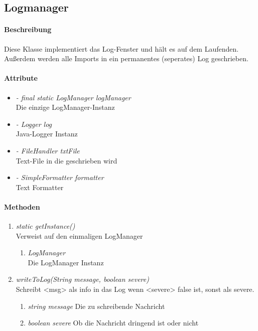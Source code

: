 \subsection{Logmanager}

\paragraph{Beschreibung}
Diese Klasse implementiert das Log-Fenster und hält es auf dem Laufenden.
Außerdem werden alle Imports in ein permanentes (seperates) Log geschrieben.


\paragraph{Attribute}

\begin{itemize}
	
\item \textit{- final static LogManager logManager}  
\\ Die einzige LogManager-Instanz 
\item \textit{- Logger log}
\\ Java-Logger Instanz
\item \textit{- FileHandler txtFile}
\\ Text-File in die geschrieben wird
\item \textit{-  SimpleFormatter formatter}
\\ Text Formatter

\end{itemize}

\paragraph{Methoden}

\begin{enumerate}[+]

	\item \textit{static getInstance()}  \\ Verweist auf den einmaligen LogManager
	
	\vspace{-0.2cm}
	\begin{enumerate}[$\circ$]
		\item \textit{LogManager} \\ Die LogManager Instanz
	\end{enumerate}

\item \textit{writeToLog(String message, boolean severe)} \\ Schreibt <msg> als info in das Log wenn <severe> false ist,
sonst als severe.
\begin{enumerate}[$\bullet$]
\item \textit{string message} Die zu schreibende Nachricht
\item \textit{boolean severe} Ob die Nachricht dringend ist oder nicht
\end{enumerate}
\end{enumerate}


